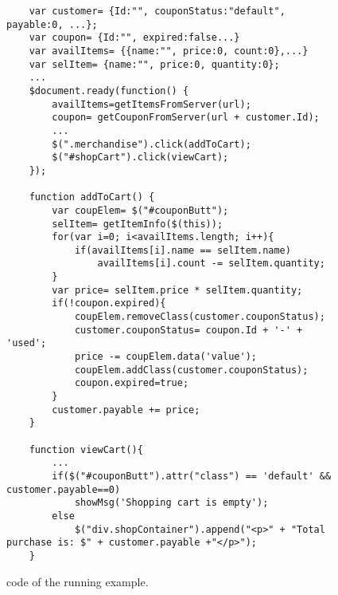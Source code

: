 \begin{figure}
\begin{lstlisting}
	var customer= {Id:"", couponStatus:"default", payable:0, ...};
	var coupon= {Id:"", expired:false...}
	var availItems= {{name:"", price:0, count:0},...}
	var selItem= {name:"", price:0, quantity:0};
	...
	$document.ready(function() {
		availItems=getItemsFromServer(url);
		coupon= getCouponFromServer(url + customer.Id);		
		...	
		$(".merchandise").click(addToCart);
		$("#shopCart").click(viewCart);
	});
	
	function addToCart() {
		var coupElem= $("#couponButt");
		selItem= getItemInfo($(this));
		for(var i=0; i<availItems.length; i++){
			if(availItems[i].name == selItem.name)
				availItems[i].count -= selItem.quantity;		
		}
		var price= selItem.price * selItem.quantity;
		if(!coupon.expired){
			coupElem.removeClass(customer.couponStatus);
			customer.couponStatus= coupon.Id + '-' + 'used';
			price -= coupElem.data('value');	
			coupElem.addClass(customer.couponStatus);
			coupon.expired=true;	
		} 	
		customer.payable += price;
	}

	function viewCart(){
		...
		if($("#couponButt").attr("class") == 'default' && customer.payable==0)
			showMsg('Shopping cart is empty');
		else
			$("div.shopContainer").append("<p>" + "Total purchase is: $" + customer.payable +"</p>");
	}
\end{lstlisting}
\caption{\javascript code of the running example.}
\label{Fig:example}
\end{figure}